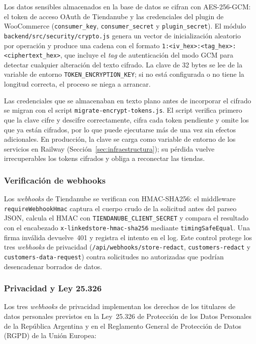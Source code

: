 Los datos sensibles almacenados en la base de datos se cifran con AES-256-GCM: el token de acceso OAuth de Tiendanube y las credenciales del plugin de WooCommerce (\texttt{consumer\_key}, \texttt{consumer\_secret} y \texttt{plugin\_secret}). El módulo \texttt{backend/src/security/crypto.js} genera un vector de inicialización aleatorio por operación y produce una cadena con el formato \texttt{1:<iv\_hex>:<tag\_hex>:<ciphertext\_hex>}, que incluye el \emph{tag} de autenticación del modo GCM para detectar cualquier alteración del texto cifrado. La clave de 32 bytes se lee de la variable de entorno \texttt{TOKEN\_ENCRYPTION\_KEY}; si no está configurada o no tiene la longitud correcta, el proceso se niega a arrancar.

Las credenciales que se almacenaban en texto plano antes de incorporar el cifrado se migran con el script \texttt{migrate-encrypt-tokens.js}. El script verifica primero que la clave cifre y descifre correctamente, cifra cada token pendiente y omite los que ya están cifrados, por lo que puede ejecutarse más de una vez sin efectos adicionales. En producción, la clave se carga como variable de entorno de los servicios en Railway (Sección~\ref{sec:infraestructura}); su pérdida vuelve irrecuperables los tokens cifrados y obliga a reconectar las tiendas.

\subsubsection{Verificación de webhooks}
\label{sec:webhooks-hmac}

Los \emph{webhooks} de Tiendanube se verifican con HMAC-SHA256: el middleware \texttt{requireWebhookHmac} captura el cuerpo crudo de la solicitud antes del parseo JSON, calcula el HMAC con \texttt{TIENDANUBE\_CLIENT\_SECRET} y compara el resultado con el encabezado \texttt{x-linkedstore-hmac-sha256} mediante \texttt{timingSafeEqual}. Una firma inválida devuelve~401 y registra el intento en el log. Este control protege los tres \emph{webhooks} de privacidad (\texttt{/api/webhooks/store-redact}, \texttt{customers-redact} y \texttt{customers-data-request}) contra solicitudes no autorizadas que podrían desencadenar borrados de datos.

\subsubsection{Privacidad y Ley 25.326}
\label{sec:privacidad-ley}

Los tres \emph{webhooks} de privacidad implementan los derechos de los titulares de datos personales previstos en la Ley~25.326 de Protección de los Datos Personales de la República Argentina \parencite{Ley25326} y en el Reglamento General de Protección de Datos (RGPD) de la Unión Europea:

